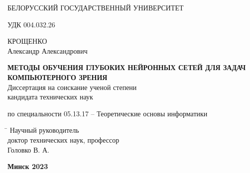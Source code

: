 \begin{titlepage}

\begin{center} \bfseries
\bigskip
\medskip

{БЕЛОРУССКИЙ ГОСУДАРСТВЕННЫЙ УНИВЕРСИТЕТ}
\end{center}
\vspace{1cm}

\noindent УДК 004.032.26 \\
\vspace{1cm}

\begin{center}
{КРОЩЕНКО \\ Александр Александрович}\\ \vspace{1cm}

{\bfseries МЕТОДЫ ОБУЧЕНИЯ ГЛУБОКИХ НЕЙРОННЫХ СЕТЕЙ 
ДЛЯ ЗАДАЧ КОМПЬЮТЕРНОГО ЗРЕНИЯ}\\
\vspace{2cm}
Диссертация на соискание ученой степени\\
кандидата технических наук\\
\bigskip

по специальности 05.13.17 -- Теоретические основы информатики
\end{center}
\vspace{3cm}

\begin{tabbing}
\hspace{8cm} \= \kill \>
Научный руководитель \+ \\
доктор технических наук, профессор\\
Головко В. А.
\end{tabbing}
\vspace{7cm}

\begin{center}
 \bfseries Минск 2023
\end{center}

\end{titlepage}